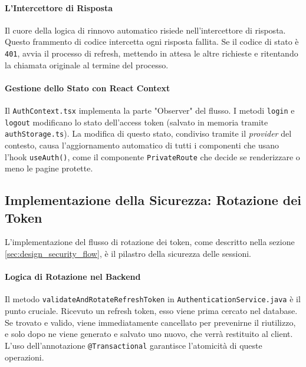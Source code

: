 \documentclass[12pt,a4paper,openright,twoside]{book}
\begin{document}
\paragraph{L'Intercettore di Risposta}
Il cuore della logica di rinnovo automatico risiede nell'intercettore di risposta. Questo frammento di codice intercetta ogni risposta fallita. Se il codice di stato è \texttt{401}, avvia il processo di refresh, mettendo in attesa le altre richieste e ritentando la chiamata originale al termine del processo.


\paragraph{Gestione dello Stato con React Context}
Il \texttt{AuthContext.tsx} implementa la parte "Observer" del flusso. I metodi \texttt{login} e \texttt{logout} modificano lo stato dell'access token (salvato in memoria tramite \texttt{authStorage.ts}). La modifica di questo stato, condiviso tramite il \textit{provider} del contesto, causa l'aggiornamento automatico di tutti i componenti che usano l'hook \texttt{useAuth()}, come il componente \texttt{PrivateRoute} che decide se renderizzare o meno le pagine protette.


\subsection{Implementazione della Sicurezza: Rotazione dei Token}
\label{subsec:impl_security}
L'implementazione del flusso di rotazione dei token, come descritto nella sezione \ref{sec:design_security_flow}, è il pilastro della sicurezza delle sessioni.

\paragraph{Logica di Rotazione nel Backend}
Il metodo \texttt{validateAndRotateRefreshToken} in \texttt{AuthenticationService.java} è il punto cruciale. Ricevuto un refresh token, esso viene prima cercato nel database. Se trovato e valido, viene immediatamente cancellato per prevenirne il riutilizzo, e solo dopo ne viene generato e salvato uno nuovo, che verrà restituito al client. L'uso dell'annotazione \texttt{@Transactional} garantisce l'atomicità di queste operazioni.
\end{document}
